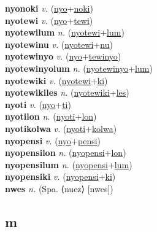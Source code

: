 \textbf{nyonoki} \textit{v.} (\hyperref[nyo]{nyo}+\hyperref[noki]{noki})
 \label{nyonoki} \\
\textbf{nyotewi} \textit{v.} (\hyperref[nyo]{nyo}+\hyperref[tewi]{tewi})
 \label{nyotewi} \\
\textbf{nyotewilum} \textit{n.} (\hyperref[nyotewi]{nyotewi}+\hyperref[lum]{lum})
 \label{nyotewilum} \\
\textbf{nyotewinu} \textit{v.} (\hyperref[nyotewi]{nyotewi}+\hyperref[nu]{nu})
 \label{nyotewinu} \\
\textbf{nyotewinyo} \textit{v.} (\hyperref[nyo]{nyo}+\hyperref[tewinyo]{tewinyo})
 \label{nyotewinyo} \\
\textbf{nyotewinyolum} \textit{n.} (\hyperref[nyotewinyo]{nyotewinyo}+\hyperref[lum]{lum})
 \label{nyotewinyolum} \\
\textbf{nyotewiki} \textit{v.} (\hyperref[nyotewi]{nyotewi}+\hyperref[ki]{ki})
 \label{nyotewiki} \\
\textbf{nyotewikiles} \textit{n.} (\hyperref[nyotewiki]{nyotewiki}+\hyperref[les]{les})
 \label{nyotewikiles} \\
\textbf{nyoti} \textit{v.} (\hyperref[nyo]{nyo}+\hyperref[ti]{ti})
 \label{nyoti} \\
\textbf{nyotilon} \textit{n.} (\hyperref[nyoti]{nyoti}+\hyperref[lon]{lon})
 \label{nyotilon} \\
\textbf{nyotikolwa} \textit{v.} (\hyperref[nyoti]{nyoti}+\hyperref[kolwa]{kolwa})
 \label{nyotikolwa} \\
\textbf{nyopensi} \textit{v.} (\hyperref[nyo]{nyo}+\hyperref[pensi]{pensi})
 \label{nyopensi} \\
\textbf{nyopensilon} \textit{n.} (\hyperref[nyopensi]{nyopensi}+\hyperref[lon]{lon})
 \label{nyopensilon} \\
\textbf{nyopensilum} \textit{n.} (\hyperref[nyopensi]{nyopensi}+\hyperref[lum]{lum})
 \label{nyopensilum} \\
\textbf{nyopensiki} \textit{v.} (\hyperref[nyopensi]{nyopensi}+\hyperref[ki]{ki})
 \label{nyopensiki} \\
\textbf{nwes} \textit{n.} (Spa. ⟨nuez⟩ [nwes])
 \label{nwes} \\
\subsection{m}


